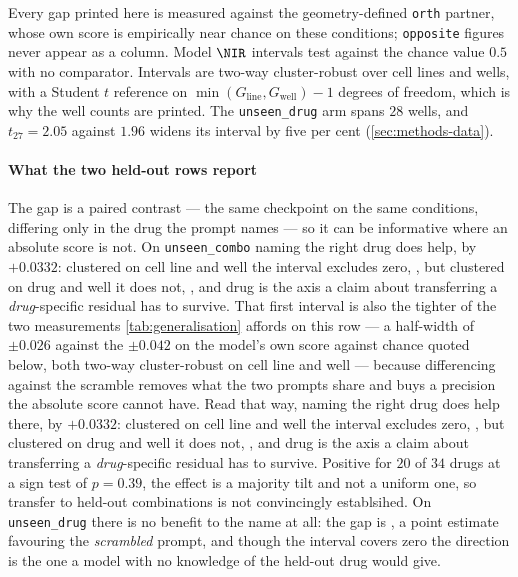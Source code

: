 \begin{table}[htbp]
\begin{fullwidth}
\begin{threeparttable}
\begin{tabularx}{\linewidth}
\bottomrule
\end{tabularx}
\begin{tablenotes}[flushleft]\footnotesize
\item Every gap printed here is measured against the geometry-defined
\texttt{orth} partner, whose own score is empirically near chance on these
conditions; \texttt{opposite} figures never appear as a column. Model $\NIR$
intervals test against the chance value $0.5$ with no comparator. Intervals are
two-way cluster-robust over cell lines and wells, with a Student $t$ reference
on $\min(G_{\textrm{line}}, G_{\textrm{well}}) - 1$ degrees of freedom, which is
why the well counts are printed. The \texttt{unseen\_drug} arm spans $28$
wells, and $t_{27} = 2.05$ against $1.96$ widens its interval by five per cent
(\cref{sec:methods-data}).
\end{tablenotes}
\end{threeparttable}
\end{fullwidth}
\end{table}

\paragraph{What the two held-out rows report} The gap is a paired contrast --- the
same checkpoint on the same conditions, differing only in the drug the prompt
names --- so it can be informative where an absolute score is not. On
\texttt{unseen\_combo} naming the right drug does help, by $+0.0332$: clustered on
cell line and well the interval excludes zero, , but
clustered on drug and well it does not, , and drug
is the axis a claim about transferring a \emph{drug}-specific residual has to
survive. That first interval is also the tighter of the two measurements
\cref{tab:generalisation} affords on this row --- a half-width of $\pm 0.026$
against the $\pm 0.042$ on the model's own score against chance quoted below,
both two-way cluster-robust on cell line and well --- because differencing against
the scramble removes what the two prompts share and buys a precision the absolute
score cannot have. Read that way, naming the right drug does help there, by
$+0.0332$: clustered on cell line and well the interval excludes zero,
, but clustered on drug and well it does not,
, and drug is the axis a claim about transferring a
\emph{drug}-specific residual has to survive. Positive for $20$ of $34$ drugs at a
sign test of $p = 0.39$, the effect is a majority tilt and not a uniform one, so
transfer to held-out combinations is not convincingly establsihed. On \texttt{unseen\_drug}
there is no benefit to the name at all: the gap is
, a point estimate favouring the \emph{scrambled}
prompt, and though the interval covers zero the direction is the one a model with
no knowledge of the held-out drug would give.

